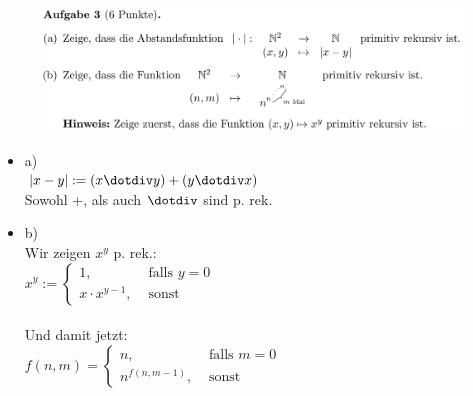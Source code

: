 \documentclass[a4paper]{scrartcl}%
\begin{document}
\section*{}%
\label{sec:aufgabe_3}

    \begin{figure}[H]
        \includegraphics[scale=0.3]{./A-3.png}
        \label{fig:}
    \end{figure}

    \begin{itemize}
        \item a)\\
            $|x-y| := (x \dotdiv y) + (y \dotdiv x)$\\
            Sowohl +, als auch $\dotdiv$ sind p. rek.\\
        \item b)\\
            Wir zeigen $x^y$ p. rek.:\\
            $x^y := \begin{cases}
                        1, &\text{ falls }y=0\\
                        x \cdot x^{y-1}, &\text{ sonst }
                    \end{cases}$\\
            \\Und damit jetzt:\\
            $f(n,m) = \begin{cases}
                n, &\text{ falls }m=0\\
                n^{f(n,m-1)}, &\text{ sonst}
            \end{cases}$\\

    \end{itemize}

    
\end{document}
